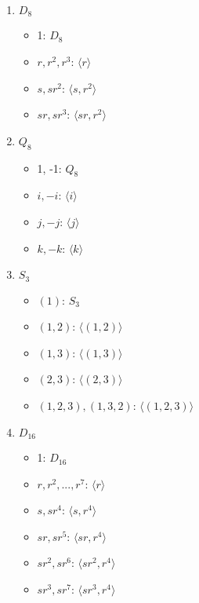 \documentclass{article}
\begin{document}
\begin{enumerate}[label=(\alph*), itemsep=0em]
    \item $D_8$
          \begin{itemize}[itemsep=0em]
            \item 1: $D_8$
            \item $r, r^2, r^3$: $\langle r \rangle$
            \item $s, sr^2$: $\langle s, r^2 \rangle$
            \item $sr, sr^3$: $\langle sr, r^2 \rangle$
          \end{itemize}
    \item $Q_8$
          \begin{itemize}[itemsep=0em]
            \item 1, -1: $Q_8$
            \item $i, -i$: $\langle i \rangle$
            \item $j, -j$: $\langle j \rangle$
            \item $k, -k$: $\langle k \rangle$
          \end{itemize}
    \item $S_3$
          \begin{itemize}[itemsep=0em]
            \item $(1)$: $S_3$
            \item $(1, 2)$: $\langle (1, 2) \rangle$
            \item $(1, 3)$: $\langle (1, 3) \rangle$
            \item $(2, 3)$: $\langle (2, 3) \rangle$
            \item $(1, 2, 3), (1, 3, 2)$: $\langle (1, 2, 3) \rangle$
          \end{itemize}
    \item $D_{16}$
          \begin{itemize}[itemsep=0em]
            \item 1: $D_{16}$
            \item $r, r^2, ..., r^7$: $\langle r \rangle$
            \item $s, sr^4$: $\langle s, r^4 \rangle$
            \item $sr, sr^5$: $\langle sr, r^4 \rangle$
            \item $sr^2, sr^6$: $\langle sr^2, r^4 \rangle$
            \item $sr^3, sr^7$: $\langle sr^3, r^4 \rangle$
          \end{itemize}
\end{enumerate}
\end{document}
